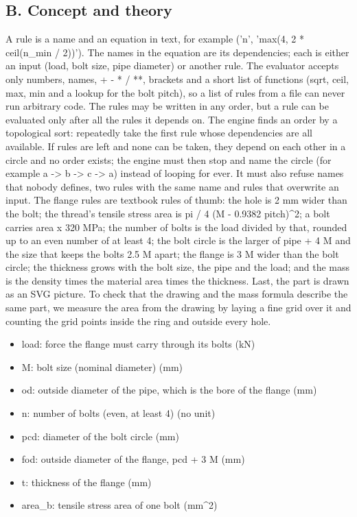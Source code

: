 \documentclass[11pt,a4paper]{article}
\begin{document}
\subsection*{B. Concept and theory}
A rule is a name and an equation in text, for example ('n', 'max(4, 2 * ceil(n\_min / 2))'). The names in the equation are its dependencies; each is either an input (load, bolt size, pipe diameter) or another rule. The evaluator accepts only numbers, names, + - * / **, brackets and a short list of functions (sqrt, ceil, max, min and a lookup for the bolt pitch), so a list of rules from a file can never run arbitrary code. The rules may be written in any order, but a rule can be evaluated only after all the rules it depends on. The engine finds an order by a topological sort: repeatedly take the first rule whose dependencies are all available. If rules are left and none can be taken, they depend on each other in a circle and no order exists; the engine must then stop and name the circle (for example a -> b -> c -> a) instead of looping for ever. It must also refuse names that nobody defines, two rules with the same name and rules that overwrite an input. The flange rules are textbook rules of thumb: the hole is 2 mm wider than the bolt; the thread's tensile stress area is pi / 4 (M - 0.9382 pitch)\textasciicircum{}2; a bolt carries area x 320 MPa; the number of bolts is the load divided by that, rounded up to an even number of at least 4; the bolt circle is the larger of pipe + 4 M and the size that keeps the bolts 2.5 M apart; the flange is 3 M wider than the bolt circle; the thickness grows with the bolt size, the pipe and the load; and the mass is the density times the material area times the thickness. Last, the part is drawn as an SVG picture. To check that the drawing and the mass formula describe the same part, we measure the area from the drawing by laying a fine grid over it and counting the grid points inside the ring and outside every hole.

\begin{itemize}[nosep]
\item load: force the flange must carry through its bolts (kN)
\item M: bolt size (nominal diameter) (mm)
\item od: outside diameter of the pipe, which is the bore of the flange (mm)
\item n: number of bolts (even, at least 4) (no unit)
\item pcd: diameter of the bolt circle (mm)
\item fod: outside diameter of the flange, pcd + 3 M (mm)
\item t: thickness of the flange (mm)
\item area\_b: tensile stress area of one bolt (mm\textasciicircum{}2)
\end{itemize}
\end{document}
